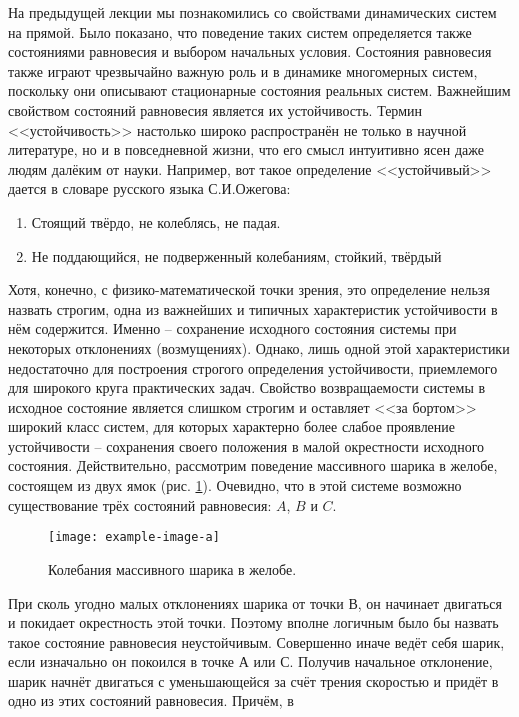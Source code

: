 \graphicspath{{fig/lect3/}}
На предыдущей лекции мы познакомились со свойствами динамических систем на прямой. Было показано, что поведение таких систем определяется также состояниями равновесия и выбором начальных условия. Состояния равновесия также играют чрезвычайно важную роль и в динамике многомерных систем, поскольку они описывают стационарные состояния реальных систем. Важнейшим свойством состояний равновесия является их устойчивость. Термин <<устойчивость>> настолько широко распространён не только в научной литературе, но и в повседневной жизни, что его смысл интуитивно ясен даже людям далёким от науки. Например, вот такое определение <<устойчивый>> дается в словаре русского языка С.И.Ожегова:
\begin{enumerate}
    \item Стоящий твёрдо, не колеблясь, не падая.
    \item Не поддающийся, не подверженный колебаниям, стойкий, твёрдый
\end{enumerate}
Хотя, конечно, с физико-математической точки зрения, это определение нельзя назвать строгим,  одна из важнейших и типичных характеристик устойчивости в нём содержится. Именно -- сохранение исходного состояния системы при некоторых отклонениях (возмущениях). Однако, лишь одной этой характеристики недостаточно для построения строгого определения устойчивости, приемлемого для широкого круга практических задач. Свойство возвращаемости системы в исходное состояние является слишком строгим и оставляет <<за бортом>> широкий класс систем, для которых характерно более слабое проявление устойчивости -- сохранения своего положения в малой окрестности исходного состояния. Действительно, рассмотрим поведение массивного шарика в желобе, состоящем из двух ямок (рис. \ref{fig:3.1}). Очевидно, что в этой системе возможно  существование трёх состояний   равновесия:
$A$, $B$ и $C$. 
\begin{figure}[h!]
    \centering
    \texttt{[image: example-image-a]}
    \label{fig:3.1}
    \caption{Колебания массивного шарика в желобе. }
\end{figure}
При сколь угодно малых отклонениях шарика от точки В, он начинает
двигаться и покидает окрестность этой точки. Поэтому вполне логичным было
бы назвать такое состояние равновесия неустойчивым. Совершенно иначе ведёт
себя шарик, если изначально он покоился в точке А или С. Получив начальное
отклонение, шарик начнёт двигаться с уменьшающейся за счёт трения
скоростью и придёт в одно из этих состояний равновесия. Причём, в

